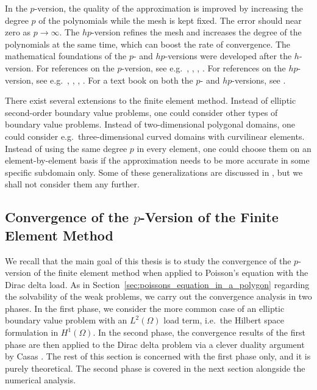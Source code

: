 \documentclass[english, 12pt, a4paper, sci, utf8, a-2b, online]{aaltothesis}
\theoremstyle{definition}
\theoremstyle{plain}
\numberwithin{equation}{section}
\begin{document}
In the $p$-version, the quality of the approximation is improved
by increasing the degree $p$ of the polynomials while the mesh is kept fixed.
The error should near zero as $p \to \infty$.
The $hp$-version refines the mesh and increases the degree of the polynomials
at the same time, which can boost the rate of convergence.
The mathematical foundations of the $p$- and $hp$-versions
were developed after the $h$-version.
For references on the $p$-version, see e.g.\
\cite{babuskaszabokatz1981}, \cite{dorr1984}, \cite{babuskasuri1987},
\cite{szabo2004}.
For references on the $hp$-version, see e.g.\
\cite{babuskadorr1981}, \cite{guo1986}, \cite{babuskasuri1987hp},
\cite{babuskasuri1994}.
For a text book on both the $p$- and $hp$-versions, see \cite{schwab1998}.

There exist several extensions to the finite element method.
Instead of elliptic second-order boundary value problems,
one could consider other types of boundary value problems.
Instead of two-dimensional polygonal domains,
one could consider e.g.\ three-dimensional curved domains with curvilinear elements.
Instead of using the same degree $p$ in every element, one could choose them
on an element-by-element basis if the approximation needs to be more accurate
in some specific subdomain only. Some of these generalizations
are discussed in \cite{szabobabuska2011},
but we shall not consider them any further.

\subsection{Convergence of the \texorpdfstring{$p$}{p}-Version of the Finite Element Method}
\label{subsec:convergence_properties_of_the_p_version}

We recall that
the main goal of this thesis is to study the convergence of the $p$-version
of the finite element method when applied to Poisson's equation with
the Dirac delta load. As in Section~\ref{sec:poissons_equation_in_a_polygon}
regarding the solvability of the weak problems, we carry out the convergence
analysis in two phases. In the first phase, we consider the more common case of
an elliptic boundary value problem with an $L^2(\Omega)$ load term, i.e.\
the Hilbert space formulation in $H^1(\Omega)$.
In the second phase, the convergence results of the first phase
are then applied to the Dirac delta problem via a clever duality
argument by Casas \cite{casas1985}.
The rest of this section is concerned with the first phase only,
and it is purely theoretical.
The second phase is covered in the next section
alongside the numerical analysis.
\end{document}
